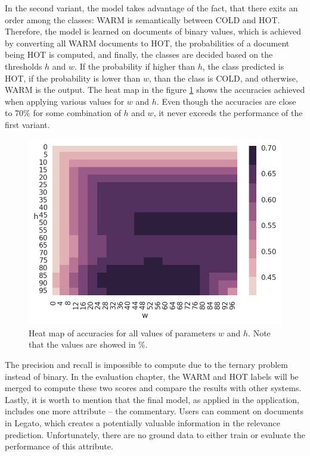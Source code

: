 \documentclass[
  digital, %
  notable,   %
  nolof,     %
  nolot,     %
]{fithesis3}
\begin{document}
In the second variant, the model takes advantage of the fact, that there exits an order among the classes: WARM is semantically between COLD and HOT.
Therefore, the model is learned on documents of binary values, which is achieved by converting all WARM documents to HOT, the probabilities of a document being HOT is computed, and finally, the classes are decided based on the thresholds $h$ and $w$.
If the probability if higher than $h$, the class predicted is HOT, if the probability is lower than $w$, than the class is COLD, and otherwise, WARM is the output.
The heat map in the figure \ref{fig:doc_two_class} shows the accuracies achieved when applying various values for $w$ and $h$.
Even though the accuracies are close to 70\% for some combination of $h$ and $w$, it never exceeds the performance of the first variant.

\begin{figure}[H]
\caption{Heat map of accuracies for all values of parameters $w$ and $h$. Note that the values are showed in \%.}
\label{fig:doc_two_class}
\includegraphics[width=\textwidth]{img/doc_two_class}
\end{figure}

The precision and recall is impossible to compute due to the ternary problem instead of binary. In the evaluation chapter, the WARM and HOT labels will be merged to compute these two scores and compare the results with other systems.
Lastly, it is worth to mention that the final model, as applied in the application, includes one more attribute -- the commentary.
Users can comment on documents in Legato, which creates a potentially valuable information in the relevance prediction.
Unfortunately, there are no ground data to either train or evaluate the performance of this attribute.
\end{document}
